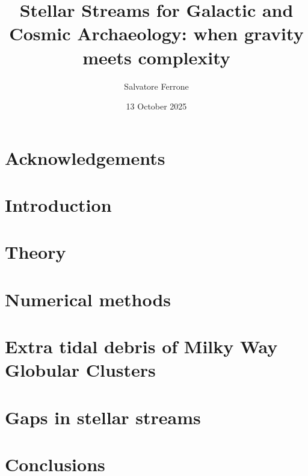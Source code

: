 \documentclass[a4paper,12pt,twoside]{book}
\title{Stellar Streams for Galactic and Cosmic Archaeology: when gravity meets complexity}
\institute{Observatoire de Paris-PSL, LIRA, UMR 8254 CNRS}
\author{Salvatore Ferrone}
\date{13 October 2025}
\begin{document}
\pslcover{}

\frontmatter
\chapter*{Acknowledgements}

\AddResumeAbstract %

\begin{singlespace} %
 {}\adjustmtc
\tableofcontents\newpage
\renewcommand{\listfigurename}{List of Figures}
\listoffigures\adjustmtc %
\listoftables\adjustmtc %
\end{singlespace}

\mainmatter
\setcounter{page}{1}
\chapter{Introduction}


\chapter{Theory}


\chapter{Numerical methods}


\chapter{Extra tidal debris of Milky Way Globular Clusters}


\chapter{Gaps in stellar streams}


\chapter{Conclusions}


\backmatter
\appendix





\begin{singlespace}
\setlength{}
\small\printbibliography[heading=bibintoc,title=Bibliography]
\end{singlespace}
\end{document}
